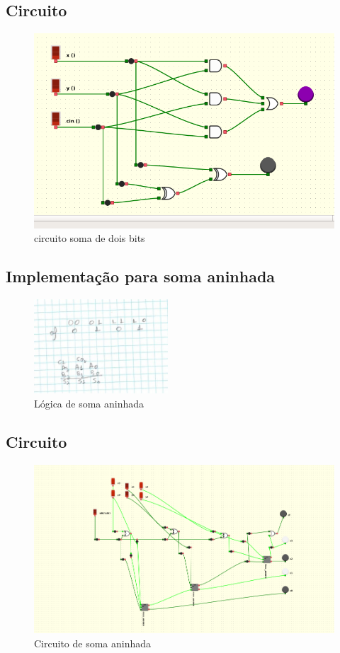 \documentclass{article}
\begin{document}
\subsection{Circuito}
\begin{figure}[!h]
\centering
\includegraphics[width=15cm]{c2.png}
\caption{circuito soma de dois bits}
\label{fig:CL_logo}
\end{figure}

\subsection{Implementação para soma aninhada}

\begin{figure}[!h]
\centering
\includegraphics[width=5cm]{somaAninhada.jpeg}
\caption{Lógica de soma aninhada}
\label{fig:CL_logo}
\end{figure}

\subsection{Circuito}
\begin{figure}[!h]
\centering
\includegraphics[width=15cm]{c3.png}
\caption{Circuito de soma aninhada}
\label{fig:CL_logo}
\end{figure}
\end{document}
